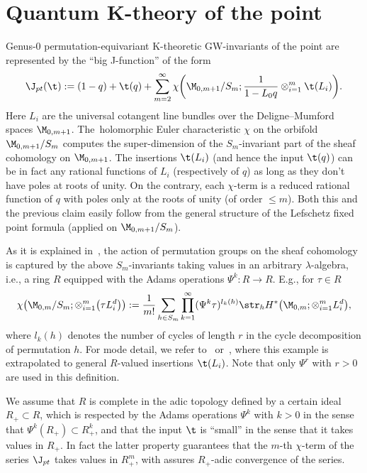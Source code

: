 \section{Quantum K-theory of the point}
\label{Sec3}

Genus-0 permutation-equivariant K-theoretic GW-invariants of the point are represented by the ``big J-function'' of the form
\[
\J_{pt}(\t):=(1-q)+\t(q)+\sum_{m=2}^{\infty}\chi
\bigg(\M_{0,m+1}/S_m; \frac{1}{1-L_0q}\otimes_{i=1}^m \t(L_i)\bigg).
\]
Here $L_i$ are the universal cotangent line bundles over the Deligne--Mumford spaces $\M_{0,m+1}$. The~holomorphic Euler characteristic $\chi$ on the orbifold $\M_{0,m+1}/S_m$ computes the super-dimen\-sion of the $S_m$-invariant part of the sheaf cohomology on $\M_{0,m+1}$. The insertions $\t(L_i)$ (and hence the input $\t(q)$) can be in fact any rational functions of $L_i$ (respectively of $q$) as long as they don't have poles at roots of unity. On the contrary, each $\chi$-term is a reduced rational function of $q$ with poles only at the roots of unity (of order $\leq m$). Both this and the previous claim easily follow from the general structure of the Lefschetz fixed point formula (applied on $\M_{0,m+1}/S_m$).

As it is explained in~\cite{Givental:perm1, Givental:perm9}, the action of permutation groups on the sheaf cohomology is captured by the above $S_m$-invariants taking values in an arbitrary $\lambda$-algebra, i.e., a ring $R$ equipped with the Adams operations $\Psi^k\colon R\to R$. E.g., for $\tau\in R$
\[
\chi\big(\M_{0,m}/S_m;\otimes_{i=1}^m \big(\tau L_i^d\big)\big) := \frac{1}{m!} \sum_{h\in S_m}\prod_{k=1}^{\infty} (\Psi^k\tau)^{l_k(h)} \str_h H^*\big(\M_{0,m};\otimes_{i=1}^mL_i^d\big),
\]
where $l_k(h)$ denotes the number of cycles of length $r$ in the cycle decomposition of permutation $h$. For mode detail, we refer to~\cite{Givental:perm1} or~\cite{Givental:perm9}, where this example is
extrapolated to general $R$-valued insertions $\t(L_i)$. Note that only $\Psi^r$ with $r>0$ are used in this definition.

We assume that $R$ is complete in the adic topology defined by a certain ideal $R_{+}\subset R$, which is respected by the Adams operations $\Psi^k$ with $k>0$ in the sense that $\Psi^k(R_{+})\subset R_{+}^k$, and that the input $\t$ is ``small'' in the sense that it takes values in $R_{+}$. In fact the latter property guarantees that the $m$-th $\chi$-term of the series $\J_{pt}$ takes values in $R_{+}^m$, with assures $R_{+}$-adic convergence of the series.

